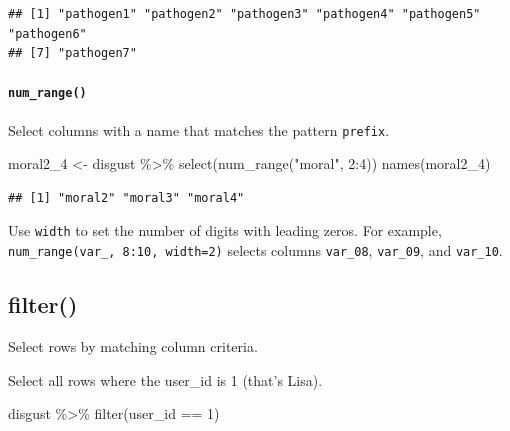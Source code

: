\documentclass[
  oneside]{book}
\newenvironment{Shaded}{\begin{snugshade}}{\end{snugshade}}
\newcommand{\DecValTok}[1]{\textcolor[rgb]{0.00,0.00,0.81}{#1}}
\newcommand{\FunctionTok}[1]{\textcolor[rgb]{0.00,0.00,0.00}{#1}}
\newcommand{\NormalTok}[1]{#1}
\newcommand{\OtherTok}[1]{\textcolor[rgb]{0.56,0.35,0.01}{#1}}
\newcommand{\SpecialCharTok}[1]{\textcolor[rgb]{0.00,0.00,0.00}{#1}}
\newcommand{\StringTok}[1]{\textcolor[rgb]{0.31,0.60,0.02}{#1}}
\begin{document}
\begin{verbatim}
## [1] "pathogen1" "pathogen2" "pathogen3" "pathogen4" "pathogen5" "pathogen6"
## [7] "pathogen7"
\end{verbatim}

\hypertarget{num_range}{%
\paragraph{\texorpdfstring{\texttt{num\_range()}}{num\_range()}}\label{num_range}}

Select columns with a name that matches the pattern \texttt{prefix}.

\begin{Shaded}
\begin{Highlighting}[]
\NormalTok{moral2\_4 }\OtherTok{\textless{}{-}}\NormalTok{ disgust }\SpecialCharTok{\%\textgreater{}\%} \FunctionTok{select}\NormalTok{(}\FunctionTok{num\_range}\NormalTok{(}\StringTok{"moral"}\NormalTok{, }\DecValTok{2}\SpecialCharTok{:}\DecValTok{4}\NormalTok{))}
\FunctionTok{names}\NormalTok{(moral2\_4)}
\end{Highlighting}
\end{Shaded}

\begin{verbatim}
## [1] "moral2" "moral3" "moral4"
\end{verbatim}

\begin{info}
Use \texttt{width} to set the number of digits with leading
zeros. For example, \texttt{num\_range(\textquotesingle{}var\_\textquotesingle{},\ 8:10,\ width=2)} selects columns \texttt{var\_08}, \texttt{var\_09}, and \texttt{var\_10}.

\end{info}

\hypertarget{filter}{%
\subsection{filter()}\label{filter}}

Select rows by matching column criteria.

Select all rows where the user\_id is 1 (that's Lisa).

\begin{Shaded}
\begin{Highlighting}[]
\NormalTok{disgust }\SpecialCharTok{\%\textgreater{}\%} \FunctionTok{filter}\NormalTok{(user\_id }\SpecialCharTok{==} \DecValTok{1}\NormalTok{)}
\end{Highlighting}
\end{Shaded}
\end{document}
